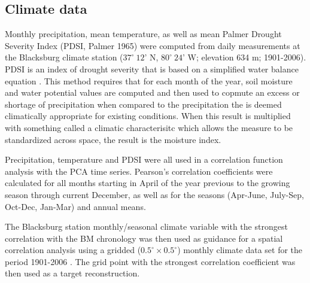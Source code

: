 \subsection{Climate data}

Monthly precipitation, mean temperature, as well as mean Palmer Drought Severity Index\label{sym:PDSI} (PDSI, Palmer 1965) were computed from daily measurements at the Blacksburg climate station ($37^{\circ} \ 12$' N, $80^{\circ}\ 24$' W; elevation 634 m; 1901-2006). PDSI is an index of drought severity that is based on a simplified water balance equation \cite{wells2004self}. This method requires that for each month of the year, soil moisture and water potential values are computed and then used to copmute an excess or shortage of precipitation when compared to the precipitation the is deemed climatically appropriate for existing conditions. When this result is multiplied with something called a climatic characterisitc which allows the measure to be standardized across space, the result is the moisture index. 

Precipitation, temperature and PDSI were all used in a correlation function analysis with the PCA time series. Pearson's correlation coefficients were calculated for all months starting in April of the year previous to the growing season through current December, as well as for the seasons (Apr-June, July-Sep, Oct-Dec, Jan-Mar) and annual means.

The Blacksburg station monthly/seasonal climate variable with the strongest correlation with the BM chronology was then used as guidance for a spatial correlation analysis using a gridded ($0.5^{\circ} \times 0.5^{\circ}$) monthly climate data set for the period 1901-2006 \cite{mitchell2005improved}. The grid point with the strongest correlation coefficient was then used as a target reconstruction.


